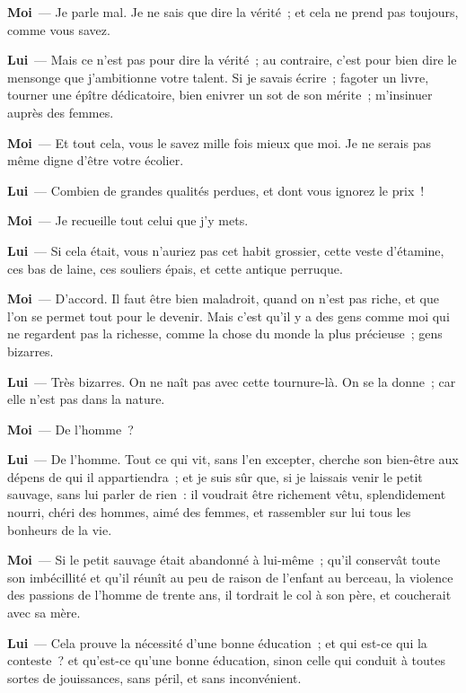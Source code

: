 \documentclass[french,twoside]{book} %
\newcommand{\labelchar}[1]{\textbf{\color{rubric} #1}}
\begin{document}
\labelchar{Moi} — Je parle mal. Je ne sais que dire la vérité ; et cela ne prend pas toujours, comme vous savez.\par
\labelchar{Lui} — Mais ce n’est pas pour dire la vérité ; au contraire, c’est pour bien dire le mensonge que j’ambitionne votre talent. Si je savais écrire ; fagoter un livre, tourner une épître dédicatoire, bien enivrer un sot de son mérite ; m’insinuer auprès des femmes.\par
\labelchar{Moi} — Et tout cela, vous le savez mille fois mieux que moi. Je ne serais pas même digne d’être votre écolier.\par
\labelchar{Lui} — Combien de grandes qualités perdues, et dont vous ignorez le prix !\par
\labelchar{Moi} — Je recueille tout celui que j’y mets.\par
\labelchar{Lui} — Si cela était, vous n’auriez pas cet habit grossier, cette veste d’étamine, ces bas de laine, ces souliers épais, et cette antique perruque.\par
\labelchar{Moi} — D’accord. Il faut être bien maladroit, quand on n’est pas riche, et que l’on se permet tout pour le devenir. Mais c’est qu’il y a des gens comme moi qui ne regardent pas la richesse, comme la chose du monde la plus précieuse ; gens bizarres.\par
\labelchar{Lui} — Très bizarres. On ne naît pas avec cette tournure-là. On se la donne ; car elle n’est pas dans la nature.\par
\labelchar{Moi} — De l’homme ?\par
\labelchar{Lui} — De l’homme. Tout ce qui vit, sans l’en excepter, cherche son bien-être aux dépens de qui il appartiendra ; et je suis sûr que, si je laissais venir le petit sauvage, sans lui parler de rien : il voudrait être richement vêtu, splendidement nourri, chéri des hommes, aimé des femmes, et rassembler sur lui tous les bonheurs de la vie.\par
\labelchar{Moi} — Si le petit sauvage était abandonné à lui-même ; qu’il conservât toute son imbécillité et qu’il réunît au peu de raison de l’enfant au berceau, la violence des passions de l’homme de trente ans, il tordrait le col à son père, et coucherait avec sa mère.\par
\labelchar{Lui} — Cela prouve la nécessité d’une bonne éducation ; et qui est-ce qui la conteste ? et qu’est-ce qu’une bonne éducation, sinon celle qui conduit à toutes sortes de jouissances, sans péril, et sans inconvénient.\par
\end{document}
